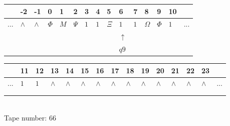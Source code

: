 \documentclass[11pt]{article}
\begin{document}
\begin{table}[H]
\centering
\begin{tabular}{lllllllllllllll}
 & -2 & -1 & 0 & 1 & 2 & 3 & 4 & 5 & 6 & 7 & 8 & 9 & 10 & \\
\hline
$...$ & \multicolumn{1}{|l|}{$\wedge$} & \multicolumn{1}{|l|}{$\wedge$} & \multicolumn{1}{|l|}{$\Phi$} & \multicolumn{1}{|l|}{$M$} & \multicolumn{1}{|l|}{$\Psi$} & \multicolumn{1}{|l|}{$1$} & \multicolumn{1}{|l|}{$1$} & \multicolumn{1}{|l|}{$\Xi$} & \multicolumn{1}{|l|}{$1$} & \multicolumn{1}{|l|}{$1$} & \multicolumn{1}{|l|}{$\Omega$} & \multicolumn{1}{|l|}{$\Phi$} & \multicolumn{1}{|l|}{$1$} & $...$\\
\hline
&  &  &  &  &  &  &  &  & $\uparrow$ &  &  &  &  &  \\
&  &  &  &  &  &  &  &  & $ q9 $ &  &  &  &  &  \\
\end{tabular}
\begin{tabular}{lllllllllllllll}
 & 11 & 12 & 13 & 14 & 15 & 16 & 17 & 18 & 19 & 20 & 21 & 22 & 23 & \\
\hline
$...$ & \multicolumn{1}{|l|}{$1$} & \multicolumn{1}{|l|}{$1$} & \multicolumn{1}{|l|}{$\wedge$} & \multicolumn{1}{|l|}{$\wedge$} & \multicolumn{1}{|l|}{$\wedge$} & \multicolumn{1}{|l|}{$\wedge$} & \multicolumn{1}{|l|}{$\wedge$} & \multicolumn{1}{|l|}{$\wedge$} & \multicolumn{1}{|l|}{$\wedge$} & \multicolumn{1}{|l|}{$\wedge$} & \multicolumn{1}{|l|}{$\wedge$} & \multicolumn{1}{|l|}{$\wedge$} & \multicolumn{1}{|l|}{$\wedge$} & $...$\\
\hline
&  &  &  &  &  &  &  &  &  &  &  &  &  &  \\
&  &  &  &  &  &  &  &  &  &  &  &  &  &  \\
\end{tabular}
\\
Tape number: 66
\noindent\makebox[\linewidth]{\hdashrule{\textwidth}{1pt}{1pt}}\end{table}
\end{document}

